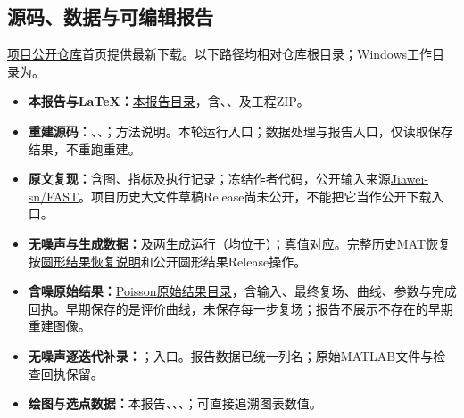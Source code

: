 \documentclass[UTF8,a4paper,11pt,fontset=fandol]{ctexart}
\begin{document}
\subsection*{源码、数据与可编辑报告}\begingroup\small\raggedright
\href{https://github.com/BoVVENGibNieAuf/LSA-FAST-Phase-Retrieval-Benchmark}{项目公开仓库}首页提供最新下载。以下路径均相对仓库根目录；Windows工作目录为。
\begin{itemize}
\item \textbf{本报告与LaTeX：}\href{https://github.com/BoVVENGibNieAuf/LSA-FAST-Phase-Retrieval-Benchmark/tree/main/reports/research_summary_20261004}{本报告目录}，含、、及工程ZIP。
\item \textbf{重建源码：}、、；方法说明。本轮运行入口；数据处理与报告入口，仅读取保存结果，不重跑重建。
\item \textbf{原文复现：}含图、指标及执行记录；冻结作者代码，公开输入来源\href{https://github.com/Jiawei-sn/FAST}{Jiawei-sn/FAST}。项目历史大文件草稿Release尚未公开，不能把它当作公开下载入口。
\item \textbf{无噪声与生成数据：}及两生成运行（均位于）；真值对应。完整历史MAT恢复按\href{https://github.com/BoVVENGibNieAuf/LSA-FAST-Phase-Retrieval-Benchmark/blob/main/CIRCULAR_RESTORE_zh.md}{圆形结果恢复说明}和公开圆形结果Release操作。
\item \textbf{含噪原始结果：}\href{https://github.com/BoVVENGibNieAuf/LSA-FAST-Phase-Retrieval-Benchmark/tree/main/runs/pilot/poisson_stage_20261004}{Poisson原始结果目录}，含输入、最终复场、曲线、参数与完成回执。早期保存的是评价曲线，未保存每一步复场；报告不展示不存在的早期重建图像。
\item \textbf{无噪声逐迭代补录：}；入口。报告数据已统一列名；原始MATLAB文件与检查回执保留。
\item \textbf{绘图与选点数据：}本报告、、、；可直接追溯图表数值。
\end{itemize}
\endgroup
\clearpage
\begingroup\small\raggedright
\end{document}
